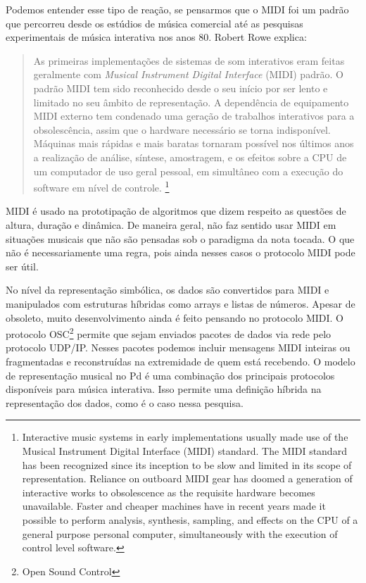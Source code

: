 \documentclass{ppgmus}
\begin{document}
Podemos entender esse tipo de reação, se pensarmos que o MIDI foi um padrão
que percorreu desde os estúdios de música comercial até as pesquisas experimentais
de música interativa nos anos 80. Robert Rowe explica:

\begin{quote}
As primeiras implementações de sistemas de som interativos eram feitas geralmente com \textit{Musical
Instrument Digital Interface} (MIDI) padrão. O padrão MIDI tem sido reconhecido desde o seu início
por ser lento e limitado no seu âmbito de representação. A dependência de equipamento MIDI externo tem
condenado uma geração de trabalhos interativos para a obsolescência, assim que o hardware necessário se torna indisponível.
Máquinas mais rápidas e mais baratas tornaram possível nos últimos anos a realização de análise, síntese, amostragem, 
e os efeitos sobre a CPU de um computador de uso geral pessoal, em simultâneo com a
execução do software em nível de controle. \cite{rowe05}
\footnote{
 Interactive music systems in early implementations usually made use of the Musical
Instrument Digital Interface (MIDI) standard. The MIDI standard has been recognized since its inception
to be slow and limited in its scope of representation. Reliance on outboard MIDI gear has
doomed a generation of interactive works to obsolescence as the requisite hardware becomes unavailable.
Faster and cheaper machines have in recent years made it possible to perform analysis, synthesis,
sampling, and effects on the CPU of a general purpose personal computer, simultaneously with the
execution of control level software.}
\end{quote}


MIDI é usado na prototipação de algoritmos que dizem respeito as questões de 
altura, duração e dinâmica. De maneira geral, não faz sentido usar MIDI em situações 
musicais que não são pensadas sob o paradigma da nota tocada. O que não é
necessariamente uma regra, pois ainda nesses casos o protocolo MIDI pode ser
útil.

No nível da representação simbólica, os dados são convertidos para MIDI e manipulados
com estruturas híbridas como arrays e listas de números. Apesar de obsoleto, muito desenvolvimento
ainda é feito pensando no protocolo MIDI. O protocolo OSC\footnote{Open Sound Control} permite que
sejam enviados pacotes de dados via rede pelo protocolo UDP/IP. Nesses pacotes podemos incluir
mensagens MIDI inteiras ou fragmentadas e reconstruídas na extremidade de quem está recebendo.
O modelo de representação musical no Pd é uma combinação dos principais protocolos disponíveis para
música interativa. Isso permite uma definição híbrida na representação dos dados, como é o caso
nessa pesquisa.
\end{document}
